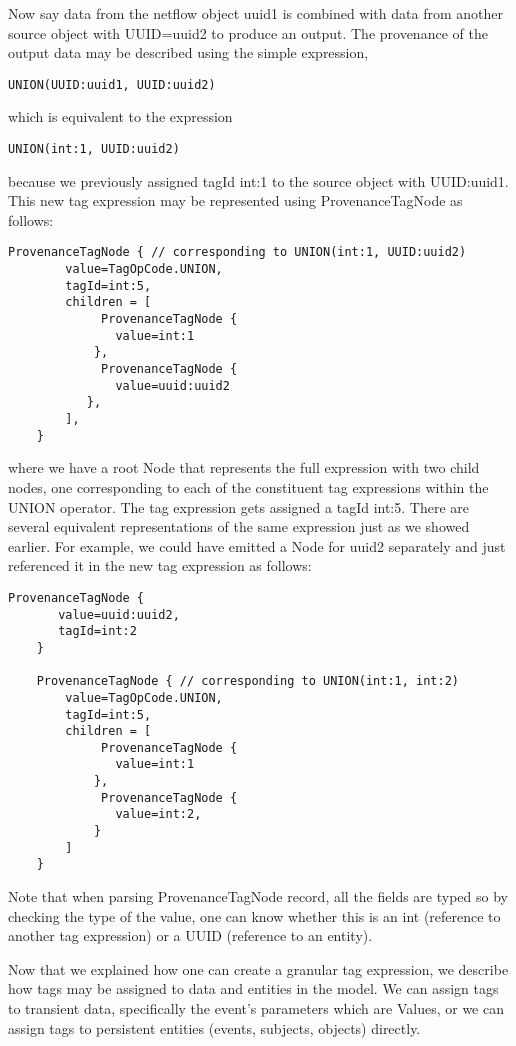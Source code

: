 Now say data from the netflow object uuid1 is combined with data from another source object with UUID=uuid2 to produce an output. The provenance of the output data may be described using the simple expression, 
\begin{Verbatim}[fontsize=\small]
UNION(UUID:uuid1, UUID:uuid2)
\end{Verbatim}
which is equivalent to the expression
\begin{Verbatim}[fontsize=\small]
UNION(int:1, UUID:uuid2)
\end{Verbatim}
because we previously assigned tagId int:1 to the source object with UUID:uuid1. This new tag expression may be represented using ProvenanceTagNode as follows:
\begin{Verbatim}[fontsize=\small]
    ProvenanceTagNode { // corresponding to UNION(int:1, UUID:uuid2)
        value=TagOpCode.UNION,
        tagId=int:5,
        children = [
             ProvenanceTagNode {
               value=int:1
            },
             ProvenanceTagNode {
               value=uuid:uuid2
           },
        ],
    }
\end{Verbatim}
where we have a root Node that represents the full expression with two child nodes, one corresponding to each of the constituent tag expressions within the UNION operator. 
The tag expression gets assigned a tagId int:5.
There are several equivalent representations of the same expression just as we showed earlier. For example, we could have emitted a Node for uuid2 separately and just referenced
it in the new tag expression as follows:
\begin{Verbatim}[fontsize=\small]
    ProvenanceTagNode {
       value=uuid:uuid2,
       tagId=int:2
    }
    
    ProvenanceTagNode { // corresponding to UNION(int:1, int:2)
        value=TagOpCode.UNION,
        tagId=int:5,
        children = [
             ProvenanceTagNode {
               value=int:1
            },
             ProvenanceTagNode {
               value=int:2,
            }
        ]
    }
\end{Verbatim}
Note that when parsing ProvenanceTagNode record, all the fields are typed so by checking the type of the value, one can know whether this is an int (reference to another tag expression) or a UUID (reference to an entity).

Now that we explained how one can create a granular tag expression, we describe how tags may be assigned to data and entities in the model. 
We can assign tags to transient data, specifically the event's parameters which are Values, or we can assign tags to persistent entities (events, subjects, objects) directly.

